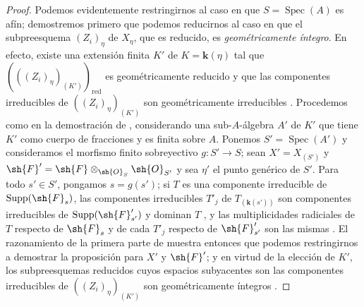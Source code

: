 \begin{proof}
\label{IV.9.8.6-proof}
Podemos evidentemente restringirnos al caso en que $S=\operatorname{Spec}(A)$ es afín; demostremos primero que podemos reducirnos al caso en que el subpreesquema $(Z_i)_\eta$ de $X_\eta$, que es reducido, es \emph{geométricamente íntegro}.
En efecto, existe una extensión finita $K'$ de $K=\mathbf{k}(\eta)$ tal que $(((Z_i)_\eta)_{(K')})_{\mathrm{red}}$ es geométricamente reducido y que las componentes irreducibles de $((Z_i)_\eta)_{(K')}$ son geométricamente irreducibles .
Procedemos como en la demostración de , considerando una sub-$A$-álgebra $A'$ de $K'$ que tiene $K'$ como cuerpo de fracciones y es finita sobre $A$.
Ponemos $S'=\operatorname{Spec}(A')$ y consideramos el morfismo finito sobreyectivo $g:S'\to S$; sean $X'=X_{(S')}$ y $\sh{F}'=\sh{F}\otimes_{\sh{O}_S}\sh{O}_{S'}$ y sea $\eta'$ el punto genérico de $S'$.
Para todo $s'\in S'$, pongamos $s=g(s')$; si $T$ es una componente irreducible de $\operatorname{Supp}(\sh{F}_s)$, las componentes irreducibles $T'_j$ de $T_{(\mathbf{k}(s'))}$ son componentes irreducibles de $\operatorname{Supp}(\sh{F}'_{s'})$ y dominan $T$ , y las multiplicidades radiciales de $T$ respecto de $\sh{F}_s$ y de cada $T'_j$ respecto de $\sh{F}'_{s'}$ son las mismas .
El razonamiento de la primera parte de  muestra entonces que podemos restringirnos a demostrar la proposición para $X'$ y $\sh{F}'$; y en virtud de la elección de $K'$, los subpreesquemas reducidos cuyos espacios subyacentes son las componentes irreducibles de $((Z_i)_\eta)_{(K')}$ son geométricamente íntegros .


\end{proof}

